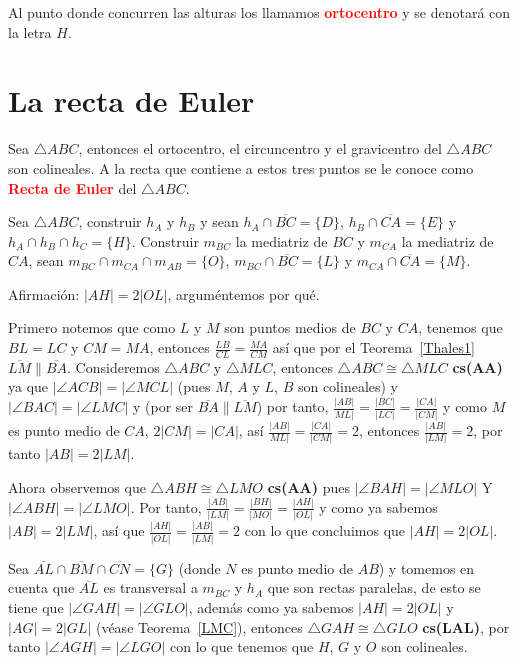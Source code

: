 Al punto donde concurren las alturas los llamamos \textcolor{red}{\bf ortocentro} y se denotará con la letra $H$. 
\section{La recta de Euler}
\begin{teo}\label{TRE}
Sea $\triangle ABC$, entonces el ortocentro, el circuncentro y el gravicentro del $\triangle ABC$ son colineales. A la recta que contiene a estos tres puntos se le conoce como \textcolor{red}{\bf Recta de Euler} del $\triangle ABC$.
\end{teo}
\begin{dem}
Sea $\triangle ABC$, construir $h_{A}$ y $h_{B}$ y sean $h_{A}\cap\overline{BC}=\{D\}$, $h_{B}\cap\overline{CA}=\{E\}$ y $h_{A}\cap h_{B}\cap h_{C}=\{H\}$. Construir $m_{BC}$ la mediatriz de $BC$ y $m_{CA}$ la mediatriz de $CA$, sean $m_{BC}\cap m_{CA}\cap m_{AB}=\{O\}$, $m_{BC}\cap\overline{BC}=\{L\}$ y $m_{CA}\cap\overline{CA}=\{M\}$.

Afirmación: $|AH|=2|OL|$, arguméntemos por qué.

Primero notemos que como $L$ y $M$ son puntos medios de $BC$ y $CA$, tenemos que $BL=LC$ y $CM=MA$, entonces $\frac{LB}{CL}=\frac{MA}{CM}$ así que por el Teorema~\ref{Thales1} $\overline{LM}\parallel\overline{BA}$.
Consideremos $\triangle ABC$ y $\triangle MLC$, entonces $\triangle ABC\cong\triangle MLC$ \textbf{cs(AA)} ya que $|\angle ACB|=|\angle MCL|$ (pues $M$, $A$ y $L$, $B$ son colineales) y  $|\angle BAC|=|\angle LMC|$ y (por ser $\overline{BA}\parallel\overline{LM}$) por tanto, $\frac{|AB|}{ML|}=\frac{|BC|}{|LC|}=\frac{|CA|}{|CM|}$ y como $M$ es punto medio de $CA$, $2|CM|=|CA|$, así  $\frac{|AB|}{ML|}=\frac{|CA|}{|CM|}=2$, entonces $\frac{|AB|}{|LM|}=2$, por tanto $|AB|=2|LM|$.

Ahora observemos que $\triangle ABH\cong\triangle LMO$ \textbf{cs(AA)} pues $|\angle BAH|=|\angle MLO|$ Y $|\angle ABH|=|\angle LMO|$. 
Por tanto, $\frac{|AB|}{|LM|}=\frac{|BH|}{|MO|}=\frac{|AH|}{|OL|}$ y como ya sabemos $|AB|=2|LM|$, así que $\frac{|AH|}{|OL|}=\frac{|AB|}{|LM|}=2$ con lo que concluimos que $|AH|=2|OL|$.

Sea $\overline{AL}\cap\overline{BM}\cap\overline{CN}=\{G\}$ (donde $N$ es punto medio de $AB$) y tomemos en cuenta que $\overline{AL}$ es transversal a $m_{BC}$ y $h_{A}$ que son rectas paralelas, de esto se tiene que $|\angle GAH|=|\angle GLO|$, además como ya sabemos $|AH|=2|OL|$ y $|AG|=2|GL|$ (véase Teorema~\ref{LMC}), entonces $\triangle GAH\cong\triangle GLO$ \textbf{cs(LAL)}, por tanto $|\angle AGH|=|\angle LGO|$ con lo que tenemos que $H$, $G$ y $O$ son colineales. 
\end{dem}


